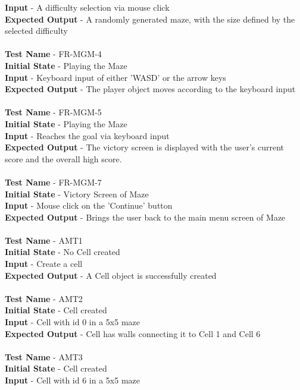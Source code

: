 \documentclass[12pt, titlepage]{article}
\begin{document}
\textbf{Input} - A difficulty selection via mouse click\\
\textbf{Expected Output} - A randomly generated maze, with the size defined by the selected difficulty\\ \\ 
\textbf{Test Name} - FR-MGM-4\\
\textbf{Initial State} - Playing the Maze\\
\textbf{Input} - Keyboard input of either 'WASD' or the arrow keys\\
\textbf{Expected Output} - The player object moves according to the keyboard input\\ \\ 
\textbf{Test Name} - FR-MGM-5\\
\textbf{Initial State} - Playing the Maze\\
\textbf{Input} - Reaches the goal via keyboard input\\
\textbf{Expected Output} - The victory screen is displayed with the user's current score and the overall high score.\\ \\
\textbf{Test Name} - FR-MGM-7\\
\textbf{Initial State} - Victory Screen of Maze\\
\textbf{Input} - Mouse click on the 'Continue' button\\
\textbf{Expected Output} - Brings the user back to the main menu screen of Maze\\ \\
\textbf{Test Name} - AMT1\\
\textbf{Initial State} - No Cell created\\
\textbf{Input} - Create a cell\\
\textbf{Expected Output} - A Cell object is successfully created\\ \\
\textbf{Test Name} - AMT2\\
\textbf{Initial State} - Cell created\\
\textbf{Input} - Cell with id 0 in a 5x5 maze\\
\textbf{Expected Output} - Cell has walls connecting it to Cell 1 and Cell 6\\ \\
\textbf{Test Name} - AMT3\\
\textbf{Initial State} - Cell created\\
\textbf{Input} - Cell with id 6 in a 5x5 maze\\
\end{document}
